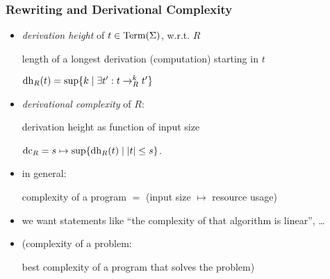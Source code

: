 \begin{frame}[fragile]
\frametitle{Rewriting and Derivational Complexity}

  \begin{itemize}[<+->]
  \item
    \emph{derivation height} of $t\in \operatorname{Term}(\Sigma)$, w.r.t. $R$

    length of a longest derivation (computation) starting in $t$

    $\operatorname{dh}_R(t)=\sup\{ k\mid \exists t': t\to_R^k t' \}$
  \item 
    \emph{derivational complexity} of $R$:

    derivation height as function of input size

    $\operatorname{dc}_R= s \mapsto \sup \{\operatorname{dh}_R(t) \mid |t|\le s \}$.
  \item in general:
    
    complexity of a program $=$ (input size $\mapsto$ resource usage)

  \item we want statements like ``the complexity of that algorithm
    is linear'', \dots

  \item     (complexity of a problem:  

    best complexity of a program that solves the problem)

  \end{itemize}

\end{frame}
